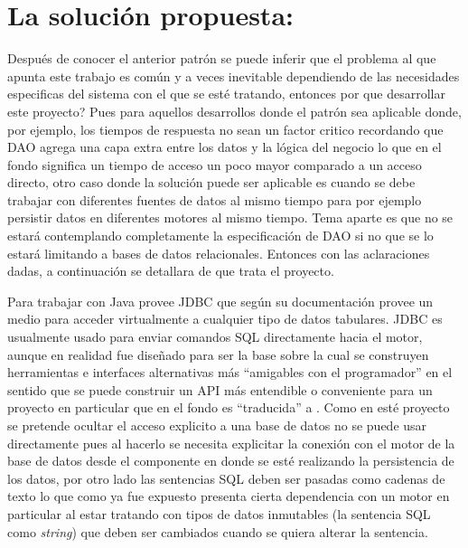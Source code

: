 \section{La solución propuesta: \jj}
Después de conocer el anterior patrón se puede inferir que el problema al que apunta este trabajo es común y a veces inevitable dependiendo de las necesidades especificas del sistema con el que se esté tratando, entonces por que desarrollar este proyecto? Pues para aquellos desarrollos donde el patrón sea aplicable donde, por ejemplo, los tiempos de respuesta no sean un factor critico recordando que DAO agrega una capa extra entre los datos y la lógica del negocio lo que en el fondo significa un tiempo de acceso un poco mayor comparado a un acceso directo, otro caso donde la solución puede ser aplicable es cuando se debe trabajar con diferentes fuentes de datos al mismo tiempo para por ejemplo persistir datos en diferentes motores al mismo tiempo. Tema aparte es que no se estará contemplando completamente la especificación de DAO si no que se lo estará limitando a bases de datos relacionales. Entonces con las aclaraciones dadas, a continuación se detallara de que trata el proyecto.

Para trabajar con \dd Java provee JDBC\cite{java:jdbc} que según su documentación provee un medio para acceder virtualmente a cualquier tipo de datos tabulares. JDBC es usualmente usado para enviar comandos SQL directamente hacia el motor, aunque en realidad fue diseñado para ser la base sobre la cual se construyen herramientas e interfaces alternativas más ``amigables con el programador'' en el sentido que se puede construir un API más entendible o conveniente para un proyecto en particular que en el fondo es ``traducida'' a \jd. Como en esté proyecto se pretende ocultar el acceso explicito a una base de datos no se puede usar directamente \jd pues al hacerlo se necesita explicitar la conexión con el motor de la base de datos desde el componente en donde se esté realizando la persistencia de los datos, por otro lado las sentencias SQL deben ser pasadas como cadenas de texto lo que como ya fue expuesto presenta cierta dependencia con un motor en particular al estar tratando con tipos de datos inmutables (la sentencia SQL como \textit{string}) que deben ser cambiados cuando se quiera alterar la sentencia.

